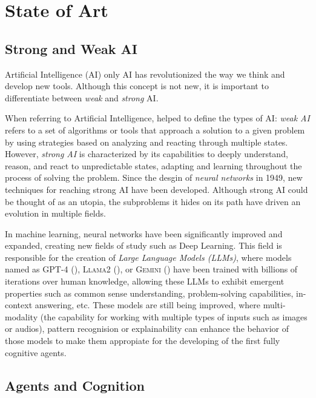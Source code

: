 \chapter{State of Art}
\section{Strong and Weak AI}

Artificial Intelligence (AI) only AI has revolutionized the way we think and develop
new tools. Although this concept is not new, it is important to differentiate
between \emph{weak} and \emph{strong} AI.

When referring to Artificial Intelligence, \citet{searle1980minds} helped to
define the types of AI: \emph{weak AI} refers to a set of algorithms or tools
that approach a solution to a given problem by using strategies based on 
analyzing and reacting through multiple states. However, \emph{strong AI} is
characterized by its capabilities to deeply understand, reason, and react to
unpredictable states, adapting and learning throughout the process of solving
the problem. Since the desgin of \emph{neural networks} in 1949, new techniques
for reaching strong AI have been developed. Although strong AI could be thought
of as an utopia, the subproblems it hides on its path have driven an evolution
in multiple fields. 

In machine learning, neural networks have been significantly improved and
expanded, creating new fields of study such as Deep Learning. This field is
responsible for the creation of \emph{Large Language Models (LLMs)}, where
models named as \textsc{GPT-4} (\citet{achiam2023gpt}), \textsc{Llama2}
(\citet{touvron2023llama}), or \textsc{Gemini} (\citet{saeidnia2023welcome}) have been
trained with billions of iterations over human knowledge, allowing these LLMs to
exhibit emergent properties such as common sense understanding, problem-solving
capabilities, in-context answering, etc. These models are still being improved,
where multi-modality (the capability for working with multiple types of inputs
such as images or audios), pattern recognision or explainability can enhance the
behavior of those models to make them appropiate for the developing of the first
fully cognitive agents.


\section{Agents and Cognition}
\label{sec:agents_and_cognition}

